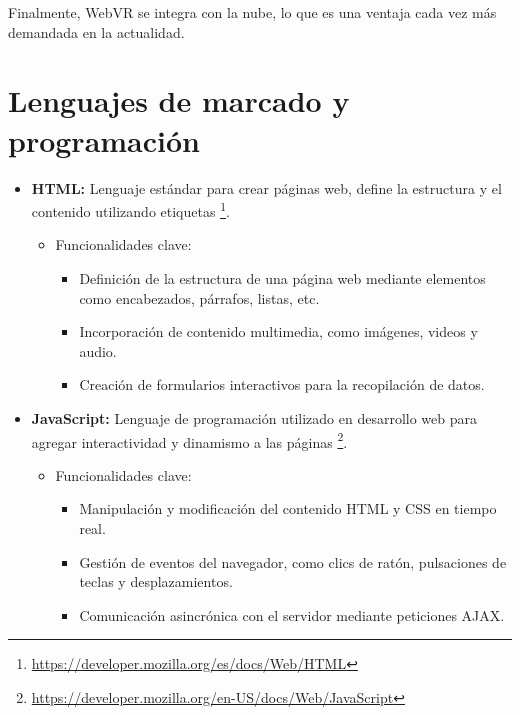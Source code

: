 \documentclass[a4paper, 12pt]{book}
\begin{document}
\bigskip

Finalmente, WebVR se integra con la nube, lo que es una ventaja cada vez más demandada en la actualidad.


\section{Lenguajes de marcado y programación} 
\label{sec:lenguajes}

\begin{itemize}
  \item \textbf{HTML:} Lenguaje estándar para crear páginas web, define la estructura y el contenido utilizando etiquetas
  \footnote{\url{https://developer.mozilla.org/es/docs/Web/HTML}}.
    \begin{itemize}
        \item Funcionalidades clave:
        \begin{itemize}
            \item Definición de la estructura de una página web mediante elementos como encabezados, párrafos, listas, etc.
            \item Incorporación de contenido multimedia, como imágenes, videos y audio.
            \item Creación de formularios interactivos para la recopilación de datos.
        \end{itemize}
    \end{itemize}
  
  \item \textbf{JavaScript:} Lenguaje de programación utilizado en desarrollo web para agregar interactividad y dinamismo a las páginas
  \footnote{\url{https://developer.mozilla.org/en-US/docs/Web/JavaScript}}.
    \begin{itemize}
        \item Funcionalidades clave:
        \begin{itemize}
            \item Manipulación y modificación del contenido HTML y CSS en tiempo real.
            \item Gestión de eventos del navegador, como clics de ratón, pulsaciones de teclas y desplazamientos.
            \item Comunicación asincrónica con el servidor mediante peticiones AJAX.
        \end{itemize}
    \end{itemize}
  

\end{itemize}
\end{document}
